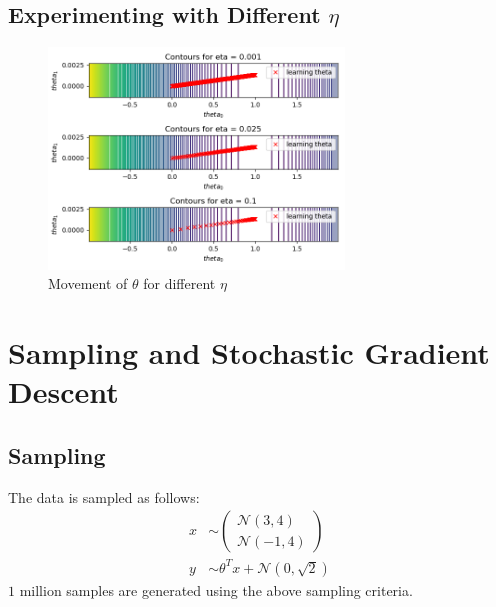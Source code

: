 \documentclass[11pt]{article}
\begin{document}
\subsection{Experimenting with Different $\eta$}
\begin{figure}[H]
    \centering
    \includegraphics[width=0.7\textwidth]{Q1/output/e.png}
    \caption{Movement of $\theta$ for different $\eta$}
\end{figure}


\section{Sampling and Stochastic Gradient Descent}

\subsection{Sampling}
The data is sampled as follows:
\begin{equation}
    \begin{split}
        x &\sim
        \begin{pmatrix}
            \mathcal{N}(3, 4)\\
            \mathcal{N}(-1, 4)
        \end{pmatrix}\\
        y &\sim \theta^T x + \mathcal{N}\left(0, \sqrt{2}\right)
    \end{split}
\end{equation}
$1$ million samples are generated using the above sampling criteria.
\end{document}
